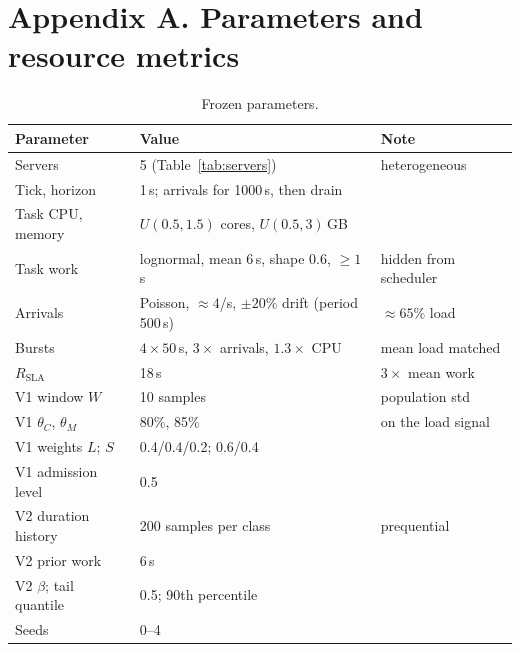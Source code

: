 \documentclass[11pt,a4paper]{article}
\begin{document}
\section*{Appendix A. Parameters and resource metrics}

\begin{table}[H]
\caption{Frozen parameters.}\label{tab:params}
\centering
\small
\begin{tabular}{lll}
\toprule
\textbf{Parameter} & \textbf{Value} & \textbf{Note}\\
\midrule
Servers & 5 (Table~\ref{tab:servers}) & heterogeneous\\
Tick, horizon & 1\,s; arrivals for 1000\,s, then drain & \\
Task CPU, memory & $U(0.5,1.5)$ cores, $U(0.5,3)$\,GB & \\
Task work & lognormal, mean 6\,s, shape 0.6, $\ge 1$\,s & hidden from scheduler\\
Arrivals & Poisson, $\approx4$/s, $\pm20\%$ drift (period 500\,s) & $\approx65\%$ load\\
Bursts & $4\times50$\,s, $3\times$ arrivals, $1.3\times$ CPU & mean load matched\\
$R_{\mathrm{SLA}}$ & 18\,s & $3\times$ mean work\\
V1 window $W$ & 10 samples & population std\\
V1 $\theta_C$, $\theta_M$ & 80\%, 85\% & on the load signal\\
V1 weights $L$; $S$ & 0.4/0.4/0.2; 0.6/0.4 & \\
V1 admission level & 0.5 & \\
V2 duration history & 200 samples per class & prequential\\
V2 prior work & 6\,s & \\
V2 $\beta$; tail quantile & 0.5; 90th percentile & \\
Seeds & 0--4 & \\
\bottomrule
\end{tabular}
\end{table}
\end{document}
